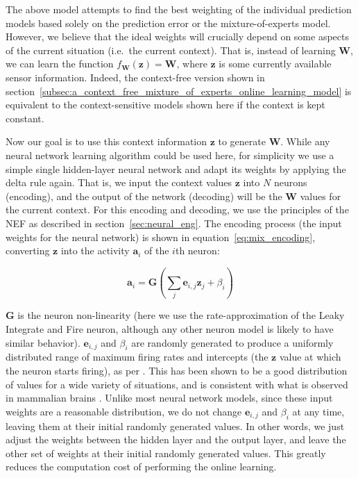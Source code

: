 The above model attempts to find the best weighting of the individual prediction models based solely on the prediction error or the mixture-of-experts model.
However, we believe that the ideal weights will crucially depend on some aspects of the current situation (i.e.\ the current context).
That is, instead of learning $ \mathbf{W}$, we can learn the function $f_{ \mathbf{W}}( \mathbf{z})= \mathbf{W}$, where $\mathbf{z}$ is some currently available sensor information.
Indeed, the context-free version shown in section~\ref{subsec:a_context_free_mixture_of_experts_online_learning_model} is equivalent to the context-sensitive models shown here if the context is kept constant.

Now our goal is to use this context information $\mathbf{z}$ to generate $\mathbf{W}$.
While any neural network learning algorithm could be used here, for simplicity we use a simple single hidden-layer neural network and adapt its weights by applying the delta rule again.
That is, we input the context values $\mathbf{z}$ into $N$ neurons (encoding), and the output of the network (decoding) will be the $\mathbf{W}$ values for the current context.
For this encoding and decoding, we use the principles of the \acf{NEF} as described in section~\ref{sec:neural_eng}.
The encoding process (the input weights for the neural network) is shown in equation~\eqref{eq:mix_encoding}, converting $\mathbf{z}$ into the activity $\mathbf{a}_i$ of the $i$th neuron:

\begin{equation}
  \mathbf{a}_{i} = \mathbf{G} \left(\sum_{j} \mathbf{e}_{i,j}\mathbf{z}_j+\beta_i\right)
  \label{eq:mix_encoding}
\end{equation}

$\mathbf{G}$ is the neuron non-linearity (here we use the rate-approximation of the Leaky Integrate and Fire neuron, although any other neuron model is likely to have similar behavior).
$\mathbf{e}_{i,j}$ and $\beta_i$ are randomly generated to produce a uniformly distributed range of maximum firing rates and intercepts (the $\mathbf{z}$ value at which the neuron starts firing), as per \textcite{Eliasmith2013}. 
This has been shown to be a good distribution of values for a wide variety of situations, and is consistent with what is observed in mammalian brains \parencite{Eliasmith2013}.
Unlike most neural network models, since these input weights are a reasonable distribution, we do not change $\mathbf{e}_{i,j}$ and $\beta_i$ at any time, leaving them at their initial randomly generated values.
In other words, we just adjust the weights between the hidden layer and the output layer, and leave the other set of weights at their initial randomly generated values.
This greatly reduces the computation cost of performing the online learning.

